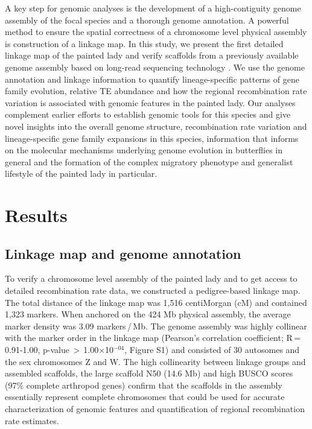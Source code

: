 \documentclass[twocolumn]{bmcart}%
\begin{document}
A key step for genomic analyses is the development of a high-contiguity genome assembly of the focal species and a thorough genome annotation. A powerful method to ensure the spatial correctness of a chromosome level physical assembly is construction of a linkage map. In this study, we present the first detailed linkage map of the painted lady and verify scaffolds from a previously available genome assembly based on long-read sequencing technology \citep{lohse_genome_2021}. 
We use the genome annotation and linkage information to quantify lineage-specific patterns of gene family evolution, relative TE abundance and how the regional recombination rate variation is associated with genomic features in the painted lady. Our analyses complement earlier efforts to establish genomic tools for this species
\citep{connahsTranscriptomeAnalysisPainted2016a, zhangHighQualityGenomeAssembly2021} and give novel insights into the overall genome structure, recombination rate variation and lineage-specific gene family expansions in this species, information that informs on the molecular mechanisms underlying genome evolution in butterflies in general and the formation of the complex migratory phenotype and generalist lifestyle of the painted lady in particular.


\section*{Results}
\subsection*{Linkage map and genome annotation}
To verify a chromosome level assembly of the painted lady \citep{lohse_genome_2021} and to get access to detailed recombination rate data, we constructed a pedigree-based linkage map. The total distance of the linkage map was 1,516 centiMorgan (cM) and contained 1,323 markers. When anchored on the 424 Mb physical assembly, the average marker density was 3.09 markers\,/\,Mb. The genome assembly was highly collinear with the marker order in the linkage map (Pearson’s correlation coefficient; R\,=\,0.91-1.00, p-value\,$>$\,1.00$\times$10$^{-04}$, Figure S1) and consisted of 30 autosomes and the sex chromosomes Z and W. The high collinearity between linkage groups and assembled scaffolds, the large scaffold N50 (14.6 Mb) and high BUSCO scores (97\% complete arthropod genes) confirm that the scaffolds in the assembly essentially represent complete chromosomes that could be used for accurate characterization of genomic features and quantification of regional recombination rate estimates.
\end{document}
